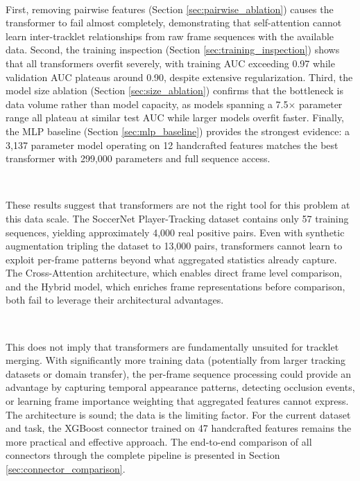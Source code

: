 \

First, removing pairwise features (Section \ref{sec:pairwise_ablation}) causes the transformer to fail almost completely, demonstrating that self-attention cannot learn inter-tracklet relationships from raw frame sequences with the available data. Second, the training inspection (Section \ref{sec:training_inspection}) shows that all transformers overfit severely, with training AUC exceeding 0.97 while validation AUC plateaus around 0.90, despite extensive regularization. Third, the model size ablation (Section \ref{sec:size_ablation}) confirms that the bottleneck is data volume rather than model capacity, as models spanning a 7.5$\times$ parameter range all plateau at similar test AUC while larger models overfit faster. Finally, the MLP baseline (Section \ref{sec:mlp_baseline}) provides the strongest evidence: a 3{,}137 parameter model operating on 12 handcrafted features matches the best transformer with 299{,}000 parameters and full sequence access.

\

These results suggest that transformers are not the right tool for this problem at this data scale. The SoccerNet Player-Tracking dataset contains only 57 training sequences, yielding approximately 4{,}000 real positive pairs. Even with synthetic augmentation tripling the dataset to 13{,}000 pairs, transformers cannot learn to exploit per-frame patterns beyond what aggregated statistics already capture. The Cross-Attention architecture, which enables direct frame level comparison, and the Hybrid model, which enriches frame representations before comparison, both fail to leverage their architectural advantages.

\

This does not imply that transformers are fundamentally unsuited for tracklet merging. With significantly more training data (potentially from larger tracking datasets or domain transfer), the per-frame sequence processing could provide an advantage by capturing temporal appearance patterns, detecting occlusion events, or learning frame importance weighting that aggregated features cannot express. The architecture is sound; the data is the limiting factor. For the current dataset and task, the XGBoost connector trained on 47 handcrafted features remains the more practical and effective approach. The end-to-end comparison of all connectors through the complete pipeline is presented in Section \ref{sec:connector_comparison}.
